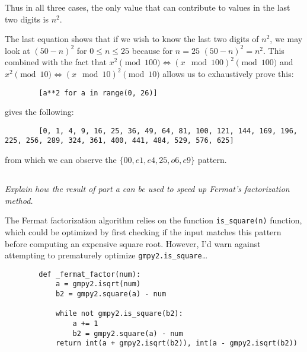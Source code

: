 \documentclass[12pt]{article}
\begin{document}
    Thus in all three cases, the only value that can contribute to values in the last two digits is $n^2$.

    The last equation shows that if we wish to know the last two digits of $n^2$, we may look at ${(50 - n)}^2$ for $0 \leq n \leq 25$ because for $n = 25$ ${(50 - n)}^2 = n^2$. This combined with the fact that $x^2 \pmod{100} \Longleftrightarrow {(x \mod 100)}^2 \pmod{100}$ and $x^2 \pmod{10} \Longleftrightarrow {(x \mod 10)}^2 \pmod{10}$ allows us to exhaustively prove this:

    \begin{verbatim}
        [a**2 for a in range(0, 26)]
    \end{verbatim}

    gives the following:

    \begin{verbatim}
        [0, 1, 4, 9, 16, 25, 36, 49, 64, 81, 100, 121, 144, 169, 196, 225, 256, 289, 324, 361, 400, 441, 484, 529, 576, 625]
    \end{verbatim}

    from which we can observe the $\{00, e1, e4, 25, o6, e9\}$ pattern.

    \subsection{} \textit{Explain how the result of part \textup{a} can be used to speed up Fermat's factorization method.}

    The Fermat factorization algorithm relies on the function \texttt{is_square(n)} function, which could be optimized by first checking if the input matches this pattern before computing an expensive square root. However, I'd warn against attempting to prematurely optimize \texttt{gmpy2.is_square}\ldots

    \begin{verbatim}
        def _fermat_factor(num):
            a = gmpy2.isqrt(num)
            b2 = gmpy2.square(a) - num

            while not gmpy2.is_square(b2):
                a += 1
                b2 = gmpy2.square(a) - num
            return int(a + gmpy2.isqrt(b2)), int(a - gmpy2.isqrt(b2))
    \end{verbatim}
\end{document}
